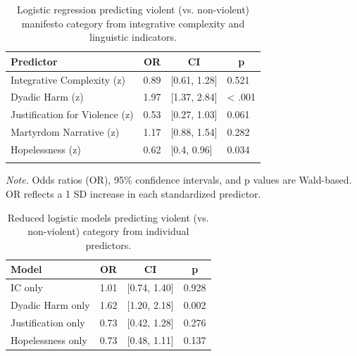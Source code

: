 \documentclass[
  english,
  man,floatsintext]{apa6}
\begin{document}
\begin{table}[tbp]

\begin{center}
\begin{threeparttable}

\caption{\label{tab:violent-logistic-models}Logistic regression predicting violent (vs. non-violent) manifesto category from integrative complexity and linguistic indicators.}

\begin{tabular}{llll}
\toprule
Predictor & \multicolumn{1}{c}{OR} & \multicolumn{1}{c}{CI} & \multicolumn{1}{c}{p}\\
\midrule
Integrative Complexity (z) & 0.89 & {}[0.61, 1.28] & 0.521\\
Dyadic Harm (z) & 1.97 & {}[1.37, 2.84] & < .001\\
Justification for Violence (z) & 0.53 & {}[0.27, 1.03] & 0.061\\
Martyrdom Narrative (z) & 1.17 & {}[0.88, 1.54] & 0.282\\
Hopelessness (z) & 0.62 & {}[0.4, 0.96] & 0.034\\
\bottomrule
\addlinespace
\end{tabular}

\begin{tablenotes}[para]
\normalsize{\textit{Note.} Odds ratios (OR), 95\% confidence intervals, and p values are Wald-based. OR reflects a 1 SD increase in each standardized predictor.}
\end{tablenotes}

\end{threeparttable}
\end{center}

\end{table}

\begin{table}[tbp]

\begin{center}
\begin{threeparttable}

\caption{\label{tab:violent-logistic-models}Reduced logistic models predicting violent (vs. non-violent) category from individual predictors.}

\begin{tabular}{llll}
\toprule
Model & \multicolumn{1}{c}{OR} & \multicolumn{1}{c}{CI} & \multicolumn{1}{c}{p}\\
\midrule
IC only & 1.01 & {}[0.74, 1.40] & 0.928\\
Dyadic Harm only & 1.62 & {}[1.20, 2.18] & 0.002\\
Justification only & 0.73 & {}[0.42, 1.28] & 0.276\\
Hopelessness only & 0.73 & {}[0.48, 1.11] & 0.137\\
\bottomrule
\end{tabular}

\end{threeparttable}
\end{center}

\end{table}
\end{document}
